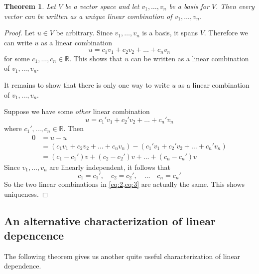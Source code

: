 \documentclass[10pt]{article}
\newtheorem{theorem}{Theorem}
\theoremstyle{definition}
\newcommand{\R}{\mathbb{R}}           %
\begin{document}
\newpage
\begin{theorem}
  Let $V$ be a vector space and let $v_{1},\ldots,v_{n}$ be a basis for $V$.
  Then every vector can be written as a unique linear combination
  of $v_{1},\ldots,v_{n}$.
\end{theorem}
\begin{proof}
  Let $u\in V$ be arbitrary. Since $v_{1},\ldots,v_{n}$ is a basis, it spans
  $V$. Therefore we can write $u$ as a linear combination
  \begin{equation}\label{eq:2}
    u = c_{1}v_{1}+c_{2}v_{2}+\ldots+c_{n}v_{n}
  \end{equation}
  for some $c_{1},\ldots,c_{n}\in \R$. This shows that $u$ can be written as a
  linear combination of $v_{1},\ldots,v_{n}$.

  It remains to show that there is only one way to write $u$ as a linear
  combination of $v_{1},\ldots,v_{n}$.

  Suppose we have some \textit{other} linear combination
  \begin{equation}\label{eq:3}
    u = c_{1}'v_{1}+c_{2}'v_{2}+\ldots+c_{n}'v_{n}
  \end{equation}
  where $c_{1}',\ldots,c_{n}\in \R$. Then
  \begin{align*}
    0 
    &= u-u\\
    &= \left(  c_{1}v_{1}+c_{2}v_{2}+\ldots+c_{n}v_{n} \right) - \left(  c_{1}'v_{1}+c_{2}'v_{2}+\ldots+c_{n}'v_{n} \right)\\ 
    &= (c_{1}-c_{1}')v+(c_{2}-c_{2}')v+\ldots+ (c_{n}-c_{n}')v
  \end{align*}
  Since $v_{1},\ldots,v_{n}$ are linearly independent, it follows that
  \begin{equation*}
    c_{1}=c_{1}', \quad c_{2}=c_{2}',\quad \ldots \quad c_{n}=c_{n}'
  \end{equation*}
  So the two linear combinations in \cref{eq:2,eq:3} are actually the same.
  This shows uniqueness.
\end{proof}



\newpage
\subsection{An alternative characterization of linear depencence}

The following theorem gives us another quite useful characterization of linear
dependence.
\end{document}
